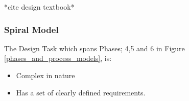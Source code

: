 *cite design textbook*

\subsubsection{Spiral Model}
The Design Task which spans Phases; 4,5 and 6 in Figure 
\ref{phases_and_process_models}, is: 
\begin{itemize}
    \item Complex in nature
    \item Has a set of clearly defined requirements. 
\end{itemize}













